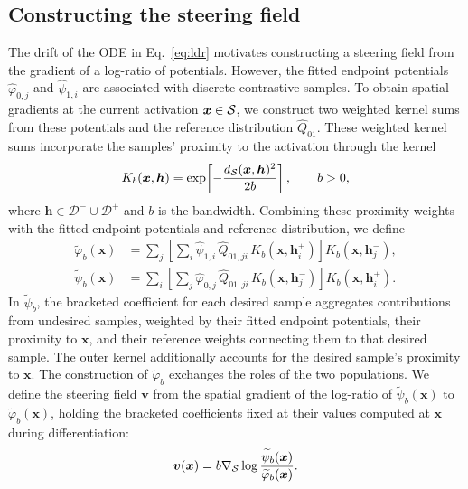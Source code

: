 \subsection{Constructing the steering field}
\label{subsec:estimation}
The drift of the ODE in Eq.~\eqref{eq:ldr} motivates constructing a steering field from the gradient of a log-ratio of potentials. However, the fitted endpoint potentials $\widehat{\varphi}_{0,j}$ and $\widehat{\psi}_{1,i}$ are associated with discrete contrastive samples. To obtain spatial gradients at the current activation $\boldsymbol{x}\in\mathcal{S}$, we construct two weighted kernel sums from these potentials and the reference distribution $\widehat{Q}_{01}$. These weighted kernel sums incorporate the samples' proximity to the activation through the kernel
\begin{equation}
\displaystyle
K_b(\boldsymbol{x},\boldsymbol{h})
=\exp\!\left[-\frac{d_{\mathcal{S}}(\boldsymbol{x},\boldsymbol{h})^2}{2b}\right],
\qquad b>0,
\label{eq:kernel}
\end{equation}
where $\boldsymbol{h}\in\mathcal{D}^-\cup\mathcal{D}^+$ and $b$ is the bandwidth. Combining these proximity weights with the fitted endpoint potentials and reference distribution, we define
\begin{align}
\widetilde{\varphi}_b(\boldsymbol{x})
&=\sum_j
\left[\sum_i \widehat{\psi}_{1,i}\,\widehat{Q}_{01,ji}\,
K_b(\boldsymbol{x},\boldsymbol{h}_i^+)\right]
K_b(\boldsymbol{x},\boldsymbol{h}_j^-),
\label{eq:local-phi}\\
\widetilde{\psi}_b(\boldsymbol{x})
&=\sum_i
\left[\sum_j \widehat{\varphi}_{0,j}\,\widehat{Q}_{01,ji}\,
K_b(\boldsymbol{x},\boldsymbol{h}_j^-)\right]
K_b(\boldsymbol{x},\boldsymbol{h}_i^+).
\label{eq:local-psi}
\end{align}
In $\widetilde{\psi}_b$, the bracketed coefficient for each desired sample aggregates contributions from undesired samples, weighted by their fitted endpoint potentials, their proximity to $\boldsymbol{x}$, and their reference weights connecting them to that desired sample. The outer kernel additionally accounts for the desired sample's proximity to $\boldsymbol{x}$. The construction of $\widetilde{\varphi}_b$ exchanges the roles of the two populations. We define the steering field $\boldsymbol{v}$ from the spatial gradient of the log-ratio of $\widetilde{\psi}_b(\boldsymbol{x})$ to $\widetilde{\varphi}_b(\boldsymbol{x})$, holding the bracketed coefficients fixed at their values computed at $\boldsymbol{x}$ during differentiation:
\begin{equation}
\displaystyle
\boldsymbol{v}(\boldsymbol{x})
=b\nabla_{\mathcal{S}}
\log\frac{\widetilde{\psi}_b(\boldsymbol{x})}
{\widetilde{\varphi}_b(\boldsymbol{x})}.
\label{eq:cobras-field}
\end{equation}

